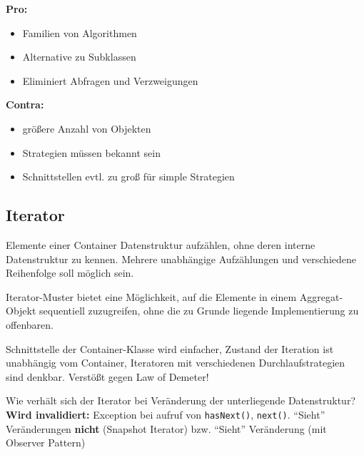 \documentclass[a4paper,fontsize=9pt, DIV=calc]{scrartcl}
\begin{document}
\begin{multicols}{2}

\begin{multicols}{2}
\textbf{Pro:}
\begin{itemize}[leftmargin=*]\itemsep-2mm
	 \item Familien von Algorithmen
	 \item Alternative zu Subklassen 
	 \item Eliminiert Abfragen und Verzweigungen
\end{itemize}
\textbf{Contra:}
\begin{itemize}[leftmargin=*]\itemsep-2mm
	 \item größere Anzahl von Objekten
	 \item Strategien müssen bekannt sein
	 \item Schnittstellen evtl. zu groß für simple Strategien
 \end{itemize}

\end{multicols}

\subsection{Iterator}
\begin{description}[leftmargin=*]\itemsep-2mm
\item[Problem] Elemente einer Container Datenstruktur aufzählen, ohne deren interne Datenstruktur zu kennen. Mehrere unabhängige Aufzählungen und verschiedene Reihenfolge soll möglich sein.
\item[Definition] Iterator-Muster bietet eine Möglichkeit, auf die Elemente in einem Aggregat-Objekt sequentiell zuzugreifen, ohne die zu Grunde liegende Implementierung zu offenbaren.
\item[Konsequenzen]  Schnittstelle der Container-Klasse wird einfacher, Zustand der Iteration ist unabhängig vom Container, Iteratoren mit verschiedenen Durchlaufstrategien sind denkbar. Verstößt gegen Law of Demeter!
\item[Realisierung] Wie verhält sich der Iterator bei Veränderung der unterliegende Datenstruktur?
\textbf{Wird invalidiert:} Exception bei aufruf von \texttt{hasNext()}, \texttt{next()}. "`Sieht"' Veränderungen \textbf{nicht} (Snapshot Iterator) bzw. "`Sieht"' Veränderung (mit Observer Pattern)
\end{description}


\end{multicols}
\end{document}
